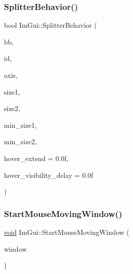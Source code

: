 \mbox{\label{namespaceImGui_a9d222e1384c6c56ff61b61cfa3016855}} 
\subsubsection{\texorpdfstring{Splitter\+Behavior()}{SplitterBehavior()}}
{\footnotesize\ttfamily bool Im\+Gui\+::\+Splitter\+Behavior (\begin{DoxyParamCaption}\item[{const \hyperlink{structImRect}{Im\+Rect} \&}]{bb,  }\item[{Im\+Gui\+ID}]{id,  }\item[{\hyperlink{imgui__internal_8h_a468e54d5ed387abfbf0d1fc1e33ab483}{Im\+Gui\+Axis}}]{axis,  }\item[{float $\ast$}]{size1,  }\item[{float $\ast$}]{size2,  }\item[{float}]{min\+\_\+size1,  }\item[{float}]{min\+\_\+size2,  }\item[{float}]{hover\+\_\+extend = {\ttfamily 0.0f},  }\item[{float}]{hover\+\_\+visibility\+\_\+delay = {\ttfamily 0.0f} }\end{DoxyParamCaption})}

\mbox{\label{namespaceImGui_afd03199380411a711c74893434d91258}} 
\subsubsection{\texorpdfstring{Start\+Mouse\+Moving\+Window()}{StartMouseMovingWindow()}}
{\footnotesize\ttfamily \hyperlink{imgui__impl__opengl3__loader_8h_ac668e7cffd9e2e9cfee428b9b2f34fa7}{void} Im\+Gui\+::\+Start\+Mouse\+Moving\+Window (\begin{DoxyParamCaption}\item[{\hyperlink{structImGuiWindow}{Im\+Gui\+Window} $\ast$}]{window }\end{DoxyParamCaption})}

\mbox{\label{namespaceImGui_a1cf931a42a10f71150def3ce222434b6}} 

